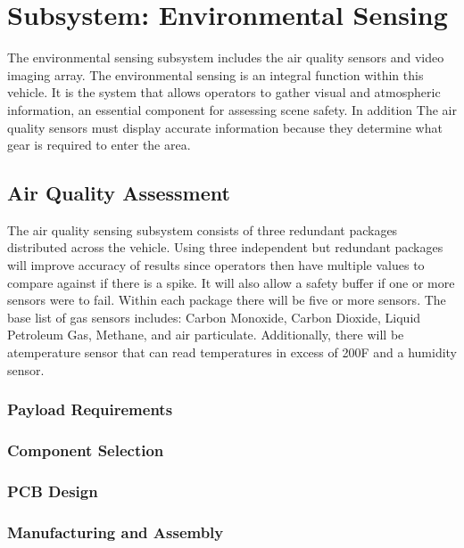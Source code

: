 \chapter{Subsystem: Environmental Sensing}
The environmental sensing subsystem includes the air quality sensors and video imaging array. The environmental sensing is an integral function within this vehicle. It is the system that allows operators to gather visual and atmospheric information, an essential component for assessing scene safety. In addition The air quality sensors must display accurate information because they determine what gear is required to enter the area.

\section{Air Quality Assessment}

The air quality sensing subsystem consists of three redundant packages distributed across the vehicle. Using three independent but redundant packages will improve accuracy of results since operators then have multiple values to compare against if there is a spike. It will also allow a safety buffer if one or more sensors were to fail. Within each package there will be five or more sensors. The base list of gas sensors includes: Carbon Monoxide, Carbon Dioxide, Liquid Petroleum Gas, Methane, and air particulate. Additionally, there will be atemperature sensor that can read temperatures in excess of 200\degree F and a humidity sensor. 

\subsection{Payload Requirements}

\subsection{Component Selection}

\subsection{PCB Design}

\subsection{Manufacturing and Assembly}

